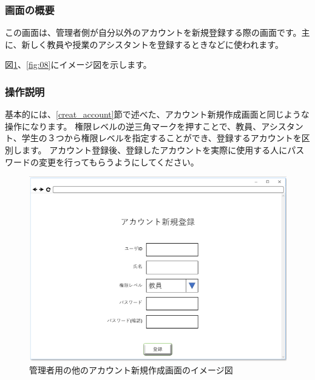 \subsubsection{画面の概要}
この画面は、管理者側が自分以外のアカウントを新規登録する際の画面です。主に、新しく教員や授業のアシスタントを登録するときなどに使われます。

図\ref{fig:07}、\ref{fig:08}にイメージ図を示します。

\subsubsection{操作説明}
基本的には、\ref{creat_account}節で述べた、アカウント新規作成画面と同じような操作になります。
権限レベルの逆三角マークを押すことで、教員、アシスタント、学生の３つから権限レベルを指定することができ、登録するアカウントを区別します。
アカウント登録後、登録したアカウントを実際に使用する人にパスワードの変更を行ってもらうようにしてください。

\begin{figure}[phtbp]
  \begin{center}
    \includegraphics[width=1\linewidth,clip]{./img/07.png}
    \caption{管理者用の他のアカウント新規作成画面のイメージ図}\label{fig:07}
  \end{center}
\end{figure}

